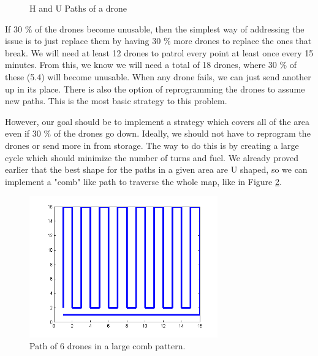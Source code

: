 \documentclass{article}
\begin{document}
\begin{figure}%
    \centering
    \qquad
    \caption{H and U Paths of a drone}%
    \label{Paths}%
\end{figure} 

If 30 \% of the drones become unusable, then the simplest way of addressing the issue is to just replace them by having 30 \% more drones to replace the ones that break. We will need at least 12 drones to patrol every point at least once every 15 minutes. From this, we know we will need a total of 18 drones, where 30 \% of these (5.4) will become unusable. When any drone fails, we can just send another up in its place. There is also the option of reprogramming the drones to assume new paths. This is the most basic strategy to this problem. 

However, our goal should be to implement a strategy which covers all of the area even if 30 \% of the drones go down. Ideally, we should not have to reprogram the drones or send more in from storage. The way to do this is by creating a large cycle which should minimize the number of turns and fuel. We already proved earlier that the best shape for the paths in a given area are U shaped, so we can implement a "comb" like path to traverse the whole map, like in Figure \ref{Comb2}. 

\begin{figure}[htb!]
\begin{center}
\includegraphics[width=3.2in]{Comb.png}
\end{center}
\caption{Path of 6 drones in a large comb pattern.
\label{Comb2}}
\end{figure} 
\end{document}
